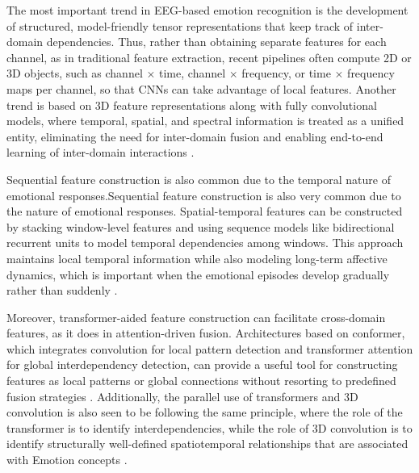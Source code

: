 \documentclass{WileyMSP-template}
\begin{document}
The most important trend in EEG-based emotion recognition is the development of structured, model-friendly tensor representations that keep track of inter-domain dependencies. Thus, rather than obtaining separate features for each channel, as in traditional feature extraction, recent pipelines often compute 2D or 3D objects, such as channel $\times$ time, channel $\times$ frequency, or time $\times$ frequency maps per channel, so that CNNs can take advantage of local features. Another trend is based on 3D feature representations along with fully convolutional models, where temporal, spatial, and spectral information is treated as a unified entity, eliminating the need for inter-domain fusion and enabling end-to-end learning of inter-domain interactions \cite{li2021_3dfeatdfcn}.

Sequential feature construction is also common due to the temporal nature of emotional responses.Sequential feature construction is also very common due to the nature of emotional responses. Spatial-temporal features can be constructed by stacking window-level features and using sequence models like bidirectional recurrent units to model temporal dependencies among windows. This approach maintains local temporal information while also modeling long-term affective dynamics, which is important when the emotional episodes develop gradually rather than suddenly \cite{lew2020bigruspatiotemporal}.

Moreover, transformer-aided feature construction can facilitate cross-domain features, as it does in attention-driven fusion. Architectures based on conformer, which integrates convolution for local pattern detection and transformer attention for global interdependency detection, can provide a useful tool for constructing features as local patterns or global connections without resorting to predefined fusion strategies \cite{song2022eegconformer}. Additionally, the parallel use of transformers and 3D convolution is also seen to be following the same principle, where the role of the transformer is to identify interdependencies, while the role of 3D convolution is to identify structurally well-defined spatiotemporal relationships that are associated with Emotion concepts \cite{sun2022paralleltransformer3dcnn}.
\end{document}
